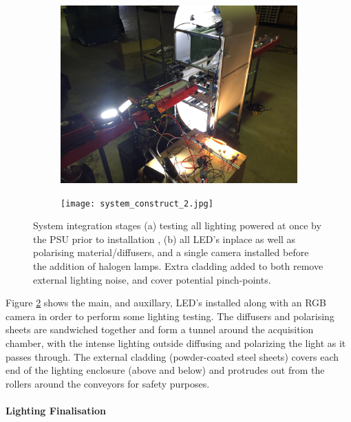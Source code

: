 \documentclass[fleqn,twoside]{article}
\begin{document}
\begin{figure}[ht]
	\centering
	\begin{subfigure}{.5\textwidth}
		\centering
		\includegraphics[width=.9\linewidth]{system_construct_1.JPG}
		\caption{}
		\label{fig:system_construct_1}
	\end{subfigure}%
	\begin{subfigure}{.5\textwidth}
		\centering
		\texttt{[image: system\_construct\_2.jpg]}
		\caption{}
		\label{fig:system_construct_2}
	\end{subfigure}%
	\caption{System integration stages (a) testing all lighting powered at once by the PSU prior to installation , (b) all LED's inplace as well as polarising material/diffusers, and a single camera installed before the addition of halogen lamps. Extra cladding added to both remove external lighting noise, and cover potential pinch-points.}
	\label{}
\end{figure}


Figure \ref{fig:system_construct_2} shows the main, and auxillary, LED's installed along with an RGB camera in order to perform some lighting testing. The diffusers and polarising sheets are sandwiched together and form a tunnel around the acquisition chamber, with the intense lighting outside diffusing and polarizing the light as it passes through. The external cladding (powder-coated steel sheets) covers each end of the lighting enclosure (above and below) and protrudes out from the rollers around the conveyors for safety purposes. 


\paragraph{Lighting Finalisation}
\end{document}
